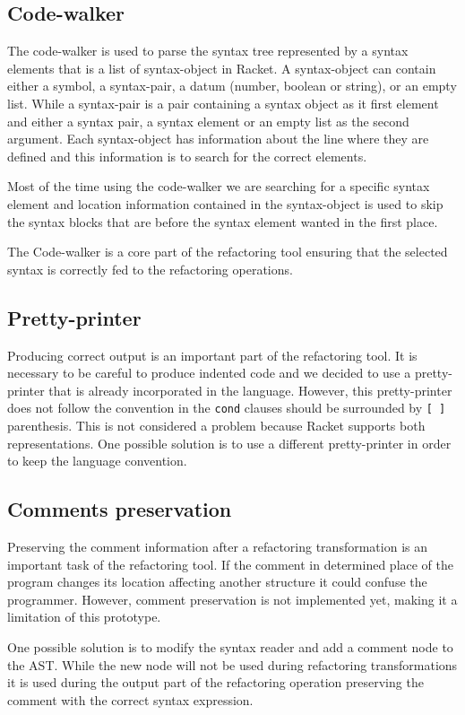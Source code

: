 \subsection{Code-walker}
The code-walker is used to parse the syntax tree represented by a syntax elements
that is a list of syntax-object in Racket.
A syntax-object can contain either a symbol, a syntax-pair, a datum (number, boolean or string),
or an empty list.
While a syntax-pair is a pair containing a syntax object as it first element and
either a syntax pair, a syntax element or an empty list as the second argument.
Each syntax-object has information about the line where they are defined and this
information is to search for the correct elements.


Most of the time using the code-walker we are searching for a specific syntax element
and location information contained in the syntax-object  is used to skip the syntax
 blocks that are before the syntax element wanted in the first place.

The Code-walker is a core part of the refactoring tool ensuring that the selected
syntax is correctly fed to the refactoring operations. %


\subsection{Pretty-printer}
Producing correct output is an important part of the refactoring tool.
It is necessary to be careful to produce indented code and we decided to use a pretty-printer
that is already incorporated in the language.
However, this pretty-printer does not follow the convention in the {\tt cond} clauses
should be surrounded by {\tt [ ] } parenthesis. This is not considered a problem because
Racket supports both representations.
One possible solution is to use a different pretty-printer in
order to keep the language convention.


\subsection{Comments preservation}
Preserving the comment information after a refactoring transformation is an important task
of the refactoring tool. If the comment in determined place of the program
changes its location affecting another structure it could confuse the programmer.
However, comment preservation is not implemented yet, making it a limitation of
this prototype.

One possible solution is to modify the syntax reader and add a comment node to the
AST.
While the new node will not be used during refactoring transformations it is used
during the output part of the refactoring operation preserving the comment with
the correct syntax expression.


